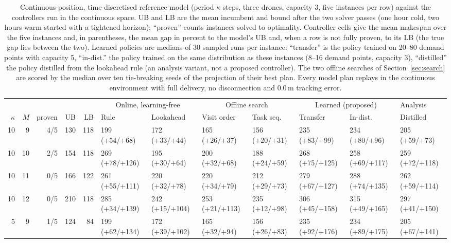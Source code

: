 \begin{table}[t]
\centering
\caption{Continuous-position, time-discretised reference model (period $\kappa$ steps, three drones, capacity 3, five instances per row) against the controllers run in the continuous space. UB and LB are the mean incumbent and bound after the two solver passes (one hour cold, two hours warm-started with a tightened horizon); ``proven'' counts instances solved to optimality. Controller cells give the mean makespan over the five instances and, in parentheses, the mean gap in percent to the model's UB and, when a row is not fully proven, to its LB (the true gap lies between the two). Learned policies are medians of 30 sampled runs per instance: ``transfer'' is the policy trained on 20--80 demand points with capacity 5, ``in-dist.'' the policy trained on the same distribution as these instances (8--16 demand points, capacity 3), ``distilled'' the policy distilled from the lookahead rule (an analysis variant, not a proposed controller). The two offline searches of Section~\ref{sec:search} are scored by the median over ten tie-breaking seeds of the projection of their best plan. Every model plan replays in the continuous environment with full delivery, no disconnection and 0.0\,m tracking error.}
\label{tab:cont}
\scriptsize\setlength{\tabcolsep}{1.9pt}
\begin{tabular}{rrrrrlllllll}
\toprule
 & & & & & \multicolumn{2}{c}{Online, learning-free} & \multicolumn{2}{c}{Offline search} & \multicolumn{2}{c}{Learned (proposed)} & Analysis \\
\cmidrule(lr){6-7}\cmidrule(lr){8-9}\cmidrule(lr){10-11}\cmidrule(lr){12-12}
$\kappa$ & $M$ & proven & UB & LB & Rule & Lookahead & Visit order & Task seq. & Transfer & In-dist. & Distilled \\
\midrule
10 & 9 & 4/5 & 130 & 118 & 199 (+54/+68) & 172 (+33/+44) & 165 (+26/+37) & 156 (+20/+31) & 235 (+83/+99) & 234 (+80/+96) & 205 (+59/+73) \\
10 & 10 & 2/5 & 154 & 118 & 269 (+78/+126) & 195 (+30/+64) & 200 (+32/+68) & 188 (+24/+59) & 268 (+75/+125) & 258 (+69/+117) & 259 (+72/+118) \\
10 & 11 & 0/5 & 166 & 122 & 261 (+55/+111) & 220 (+32/+78) & 220 (+34/+79) & 212 (+29/+73) & 279 (+67/+127) & 288 (+74/+135) & 262 (+59/+114) \\
10 & 12 & 0/5 & 210 & 118 & 285 (+34/+139) & 242 (+15/+104) & 253 (+21/+113) & 235 (+12/+98) & 306 (+45/+158) & 315 (+49/+165) & 297 (+41/+150) \\
\midrule
5 & 9 & 1/5 & 124 & 84 & 199 (+62/+134) & 172 (+39/+102) & 165 (+32/+94) & 156 (+26/+83) & 235 (+92/+176) & 234 (+89/+175) & 205 (+67/+141) \\

\end{tabular}
\end{table}
